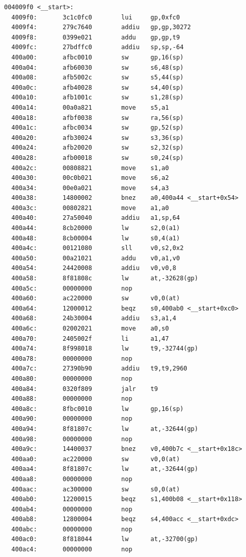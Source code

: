 \documentclass[11pt]{article}
\begin{document}
\begin{verbatim}
004009f0 <__start>:
  4009f0:       3c1c0fc0        lui     gp,0xfc0
  4009f4:       279c7640        addiu   gp,gp,30272
  4009f8:       0399e021        addu    gp,gp,t9
  4009fc:       27bdffc0        addiu   sp,sp,-64
  400a00:       afbc0010        sw      gp,16(sp)
  400a04:       afb60030        sw      s6,48(sp)
  400a08:       afb5002c        sw      s5,44(sp)
  400a0c:       afb40028        sw      s4,40(sp)
  400a10:       afb1001c        sw      s1,28(sp)
  400a14:       00a0a821        move    s5,a1
  400a18:       afbf0038        sw      ra,56(sp)
  400a1c:       afbc0034        sw      gp,52(sp)
  400a20:       afb30024        sw      s3,36(sp)
  400a24:       afb20020        sw      s2,32(sp)
  400a28:       afb00018        sw      s0,24(sp)
  400a2c:       00808821        move    s1,a0
  400a30:       00c0b021        move    s6,a2
  400a34:       00e0a021        move    s4,a3
  400a38:       14800002        bnez    a0,400a44 <__start+0x54>
  400a3c:       00802821        move    a1,a0
  400a40:       27a50040        addiu   a1,sp,64
  400a44:       8cb20000        lw      s2,0(a1)
  400a48:       8cb00004        lw      s0,4(a1)
  400a4c:       00121080        sll     v0,s2,0x2
  400a50:       00a21021        addu    v0,a1,v0
  400a54:       24420008        addiu   v0,v0,8
  400a58:       8f81808c        lw      at,-32628(gp)
  400a5c:       00000000        nop
  400a60:       ac220000        sw      v0,0(at)
  400a64:       12000012        beqz    s0,400ab0 <__start+0xc0>
  400a68:       24b30004        addiu   s3,a1,4
  400a6c:       02002021        move    a0,s0
  400a70:       2405002f        li      a1,47
  400a74:       8f998018        lw      t9,-32744(gp)
  400a78:       00000000        nop
  400a7c:       27390b90        addiu   t9,t9,2960
  400a80:       00000000        nop
  400a84:       0320f809        jalr    t9
  400a88:       00000000        nop
  400a8c:       8fbc0010        lw      gp,16(sp)
  400a90:       00000000        nop
  400a94:       8f81807c        lw      at,-32644(gp)
  400a98:       00000000        nop
  400a9c:       14400037        bnez    v0,400b7c <__start+0x18c>
  400aa0:       ac220000        sw      v0,0(at)
  400aa4:       8f81807c        lw      at,-32644(gp)
  400aa8:       00000000        nop
  400aac:       ac300000        sw      s0,0(at)
  400ab0:       12200015        beqz    s1,400b08 <__start+0x118>
  400ab4:       00000000        nop
  400ab8:       12800004        beqz    s4,400acc <__start+0xdc>
  400abc:       00000000        nop
  400ac0:       8f818044        lw      at,-32700(gp)
  400ac4:       00000000        nop

\end{verbatim}
\end{document}
